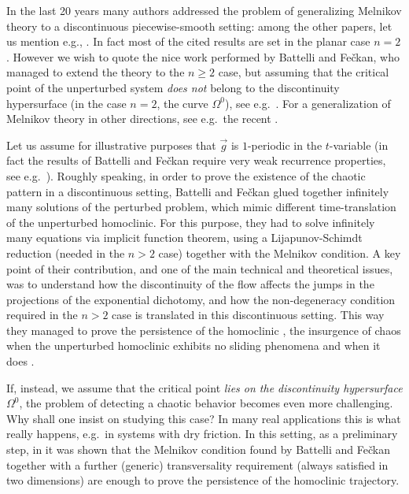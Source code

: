 \documentclass[10pt]{article}
\numberwithin{equation}{section}
\def\Om{\Omega}
\def\g{\vec{g}}
\theoremstyle{definition}
\theoremstyle{remark}
\begin{document}
In the last 20 years many authors addressed the problem of generalizing Melnikov theory
to a discontinuous piecewise-smooth setting: among the other papers, let us mention e.g.,
 \cite{K2,KRG,LPT,BF08, BF11, CaFr,CDFP,LiDu}.
In fact most of the cited results are set in the planar case $n=2$.
However we wish to quote the nice  work performed by Battelli and Fe\v ckan, who managed  to extend the theory to the $n \ge 2$ case,
but assuming that the critical point of the unperturbed system \emph{does not} belong to the discontinuity hypersurface
 (in the case $n=2$, the curve $\Om^0$),
see e.g.\ \cite{BF11}. For a generalization of Melnikov theory in other directions, see e.g.\ the recent \cite{BF22, HL24, GZ23, MV21,
ZZL21}.

 Let us assume for illustrative purposes that $\g$ is $1$-periodic in the $t$-variable
 (in fact the results of Battelli and Fe\v ckan require very weak recurrence properties, see e.g.\ \cite{BF11}).
 Roughly speaking, in order to prove the existence of the chaotic pattern
 in a discontinuous setting, Battelli and Fe\v ckan  glued together infinitely many
solutions of the perturbed problem,
  which mimic
different time-translation of the unperturbed homoclinic.
For this purpose, they had to solve infinitely many equations via implicit function theorem, using
a Lijapunov-Schimdt reduction (needed in the $n>2$ case) together with the Melnikov condition.
 A key point of their contribution, and one of the main technical and theoretical  issues,
was to understand how the discontinuity of the flow affects the jumps in the projections
of the exponential dichotomy, and how the non-degeneracy condition required in the $n>2$ case
is translated in this discontinuous setting.
This way they managed to prove the persistence of the homoclinic \cite{BF08}, the insurgence of chaos
when the unperturbed homoclinic exhibits no sliding phenomena \cite{BF11} and when it does \cite{BF10}.

If, instead, we assume that the critical point \emph{lies on the discontinuity hypersurface $\Omega^0$},
the problem of detecting a chaotic behavior becomes even more challenging.  Why shall one insist on studying this case?
 In many real applications this is what really happens, e.g.\ in systems with dry friction.
In this setting,
as a preliminary step, in \cite{CaFr} it was shown that the Melnikov condition found by Battelli and Fe\v ckan together with a further
(generic) transversality requirement
(always satisfied in two dimensions)  are enough to prove the persistence of the homoclinic trajectory.
\end{document}
